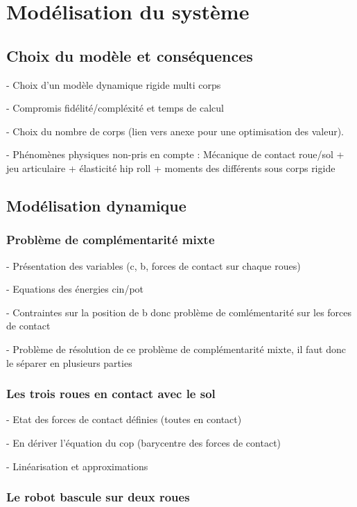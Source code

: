 \chapter{Modélisation du système}
\section{Choix du modèle et conséquences}
	
	- Choix d'un modèle dynamique rigide multi corps
	
	- Compromis fidélité/compléxité et temps de calcul
	
	- Choix du nombre de corps (lien vers anexe pour une optimisation des valeur).
	
	- Phénomènes physiques non-pris en compte : Mécanique de contact roue/sol + jeu articulaire + élasticité hip roll + moments des différents sous corps rigide
	
	\section{Modélisation dynamique}

		\subsection{Problème de complémentarité mixte}
		
			- Présentation des variables (c, b, forces de contact sur chaque roues)
		
			- Equations des énergies cin/pot

			- Contraintes sur la position de b donc problème de comlémentarité sur les forces de contact

			- Problème de résolution de ce problème de complémentarité mixte, il faut donc le séparer en plusieurs parties
		
		\subsection{Les trois roues en contact avec le sol}

			- Etat des forces de contact définies (toutes en contact)

			- En dériver l'équation du cop (barycentre des forces de contact)

			- Linéarisation et approximations
		
		\subsection{Le robot bascule sur deux roues}

